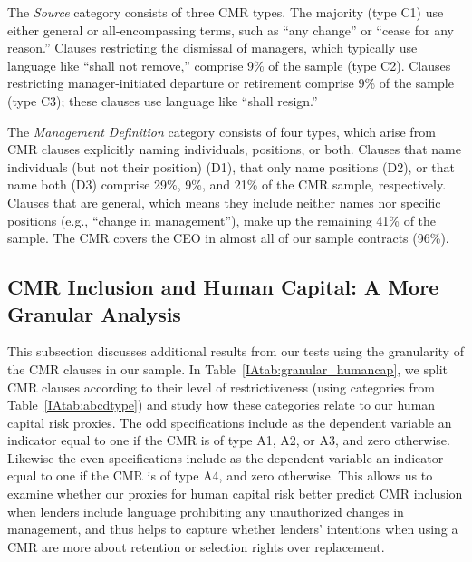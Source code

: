 \documentclass[12pt]{article}
\begin{document}
\begin{appendices}
The \textit{Source} category consists of three CMR types.
The majority (type C1) use either general or all-encompassing terms, such as ``any change'' or ``cease for any reason.''
Clauses restricting the dismissal of managers, which typically use language like ``shall not remove,'' comprise 9\% of the sample (type C2).
Clauses restricting manager-initiated departure or retirement comprise 9\% of the sample (type C3); these clauses use language like ``shall resign.''


The \textit{Management Definition} category consists of four types, which arise from CMR clauses explicitly naming individuals, positions, or both.
Clauses that name individuals (but not their position) (D1), that only name positions (D2), or that name both (D3) comprise 29\%, 9\%, and 21\% of the CMR sample, respectively.
Clauses that are general, which means they include neither names nor specific positions (e.g., ``change in management''), make up the remaining 41\% of the sample.
The CMR covers the CEO in almost all of our sample contracts (96\%).



\subsection{CMR Inclusion and Human Capital: A More Granular Analysis}
This subsection discusses additional results from our tests using the granularity of the CMR clauses in our sample.
In Table~\ref{IAtab:granular_humancap}, we split CMR clauses according to their level of restrictiveness (using categories from Table~\ref{IAtab:abcdtype}) and study how these categories relate to our human capital risk proxies.
The odd specifications include as the dependent variable an indicator equal to one if the CMR is of type A1, A2, or A3, and zero otherwise.
Likewise the even specifications include as the dependent variable an indicator equal to one if the CMR is of type A4, and zero otherwise.
This allows us to examine whether our proxies for human capital risk better predict CMR inclusion when lenders include language prohibiting any unauthorized changes in management, and thus helps to capture whether lenders' intentions when using a CMR are more about retention or selection rights over replacement.



\end{appendices}
\end{document}
